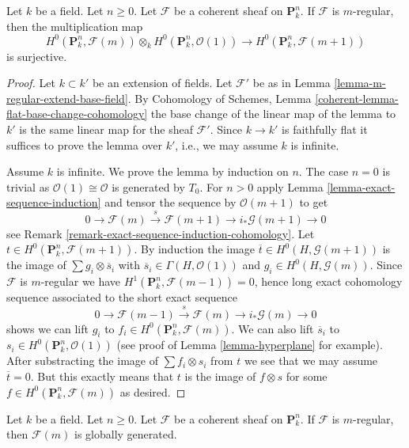 \begin{lemma}
\label{lemma-m-regular-multiply}
Let $k$ be a field. Let $n \geq 0$.
Let $\mathcal{F}$ be a coherent sheaf on $\mathbf{P}^n_k$.
If $\mathcal{F}$ is $m$-regular, then the multiplication map
$$
H^0(\mathbf{P}^n_k, \mathcal{F}(m)) \otimes_k
H^0(\mathbf{P}^n_k, \mathcal{O}(1))
\longrightarrow
H^0(\mathbf{P}^n_k, \mathcal{F}(m + 1))
$$
is surjective.
\end{lemma}

\begin{proof}
Let $k \subset k'$ be an extension of fields. Let $\mathcal{F}'$
be as in Lemma \ref{lemma-m-regular-extend-base-field}. By
Cohomology of Schemes, Lemma \ref{coherent-lemma-flat-base-change-cohomology}
the base change of the linear map of the lemma to $k'$ is the
same linear map for the sheaf $\mathcal{F}'$. Since $k \to k'$
is faithfully flat it suffices to prove the lemma over $k'$, i.e.,
we may assume $k$ is infinite.

\medskip\noindent
Assume $k$ is infinite. We prove the lemma by induction on $n$.
The case $n = 0$ is trivial as $\mathcal{O}(1) \cong \mathcal{O}$
is generated by $T_0$. For $n > 0$ apply
Lemma \ref{lemma-exact-sequence-induction}
and tensor the sequence by $\mathcal{O}(m + 1)$ to get
$$
0 \to \mathcal{F}(m) \xrightarrow{s} \mathcal{F}(m + 1) \to
i_*\mathcal{G}(m + 1) \to 0
$$
see Remark \ref{remark-exact-sequence-induction-cohomology}.
Let $t \in H^0(\mathbf{P}^n_k, \mathcal{F}(m + 1))$.
By induction the image $\overline{t} \in H^0(H, \mathcal{G}(m + 1))$
is the image of $\sum g_i \otimes \overline{s}_i$ with
$\overline{s}_i \in \Gamma(H, \mathcal{O}(1))$ and
$g_i \in H^0(H, \mathcal{G}(m))$. Since $\mathcal{F}$ is $m$-regular
we have $H^1(\mathbf{P}^n_k, \mathcal{F}(m - 1)) = 0$, hence long
exact cohomology sequence associated to the short exact sequence
$$
0 \to \mathcal{F}(m - 1) \xrightarrow{s} \mathcal{F}(m) \to
i_*\mathcal{G}(m) \to 0
$$
shows we can lift $g_i$ to $f_i \in H^0(\mathbf{P}^n_k, \mathcal{F}(m))$.
We can also lift $\overline{s}_i$ to
$s_i \in H^0(\mathbf{P}^n_k, \mathcal{O}(1))$ (see proof of
Lemma \ref{lemma-hyperplane} for example). After substracting the
image of $\sum f_i \otimes s_i$ from $t$ we see that we may assume
$\overline{t} = 0$. But this exactly means that $t$ is the
image of $f \otimes s$ for some $f \in H^0(\mathbf{P}^n_k, \mathcal{F}(m))$
as desired.
\end{proof}

\begin{lemma}
\label{lemma-m-regular-globally-generated}
Let $k$ be a field. Let $n \geq 0$.
Let $\mathcal{F}$ be a coherent sheaf on $\mathbf{P}^n_k$.
If $\mathcal{F}$ is $m$-regular, then $\mathcal{F}(m)$ is
globally generated.
\end{lemma}

